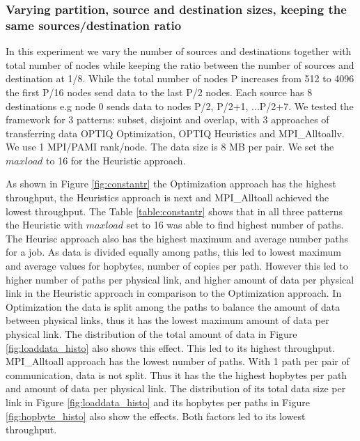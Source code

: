 \subsubsection{Varying partition, source and destination sizes, keeping the same sources/destination ratio}

In this experiment we vary the number of sources and destinations together with total number of nodes while keeping the ratio between the number of sources and destination at 1/8. While the total number of nodes P  increases from 512 to 4096 the first P/16 nodes send data to the last P/2 nodes. Each source has 8 destinations e.g node 0 sends data to nodes P/2, P/2+1, ...P/2+7. We tested the framework for 3 patterns: subset, disjoint and overlap, with 3 approaches of transferring data OPTIQ Optimization, OPTIQ Heuristics and MPI\_Alltoallv. We use 1 MPI/PAMI rank/node. The data size is 8 MB per pair. We set the $maxload$ to 16 for the Heuristic approach.

As shown in Figure \ref{fig:constantr} the Optimization approach has the highest throughput, the Heuristics approach is next and MPI\_Alltoall achieved the lowest throughput. The Table \ref{table:constantr} shows that in all three patterns the Heuristic with $maxload$ set to 16 was able to find highest number of paths. The Heurisc approach also has the highest maximum and average number paths for a job. As data is divided equally among paths, this led to lowest maximum and average values for hopbytes, number of copies per path. However this led to higher number of paths per physical link, and higher amount of data per physical link in the Heuristic approach in comparison to the Optimization approach. In Optimization the data is split among the paths to balance the amount of data between physical links, thus it has the lowest maximum amount of data per physical link. The distribution of the total amount of data in Figure \ref{fig:loaddata_histo} also shows this effect. This led to its highest throughput. MPI\_Alltoall approach has the lowest number of paths. With 1 path per pair of communication, data is not split. Thus it has the the highest hopbytes per path and amount of data per physical link. The distribution of its total data size per link in Figure \ref{fig:loaddata_histo} and its hopbytes per paths in Figure \ref{fig:hopbyte_histo} also show the effects. Both factors led to its lowest throughput.

